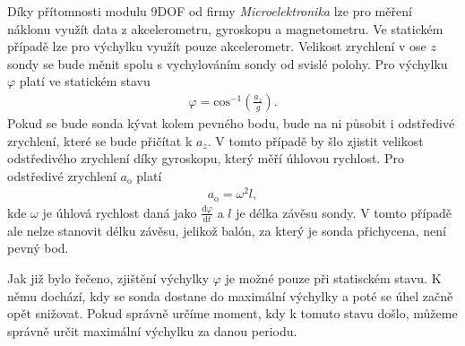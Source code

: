 \documentclass[twoside]{ctuthesis}
\newcommand{\diff}{\text{d}}
\theoremstyle{plain}
\theoremstyle{definition}
\theoremstyle{note}
\begin{document}
		Díky přítomnosti modulu 9DOF od firmy \textit{Microelektronika} lze pro měření náklonu využít data z akcelerometru, gyroskopu a magnetometru. Ve statickém případě lze pro výchylku využít pouze akcelerometr. Velikost zrychlení v ose $z$ sondy se bude měnit spolu s vychylováním sondy od svislé polohy. Pro výchylku $\varphi$ platí ve statickém stavu
		\begin{align}
			\varphi = \text{cos}^{-1}\left(\frac{a_z}{g}\right).
		\end{align}
		Pokud se bude sonda kývat kolem pevného bodu, bude na ni působit i odstředivé zrychlení, které se bude přičítat k $a_z$. V tomto případě by šlo zjistit velikost odstředivého zrychlení díky gyroskopu, který měří úhlovou rychlost. Pro odstředivé zrychlení $a_\text{o}$ platí
		\begin{align}
			a_\text{o} = \omega^2 l,
		\end{align}
		kde $\omega$ je úhlová rychlost daná jako $\frac{\diff \varphi}{\diff t}$ a $l$ je délka závěsu sondy. V tomto případě ale nelze stanovit délku závěsu, jelikož balón, za který je sonda přichycena, není pevný bod.

		Jak již bylo řečeno, zjištění výchylky $\varphi$ je možné pouze při statisckém stavu. K němu dochází, kdy se sonda dostane do maximální výchylky a poté se úhel začně opět snižovat. Pokud správně určíme moment, kdy k tomuto stavu došlo, můžeme správně určit maximální výchylku za danou periodu. 
\end{document}
